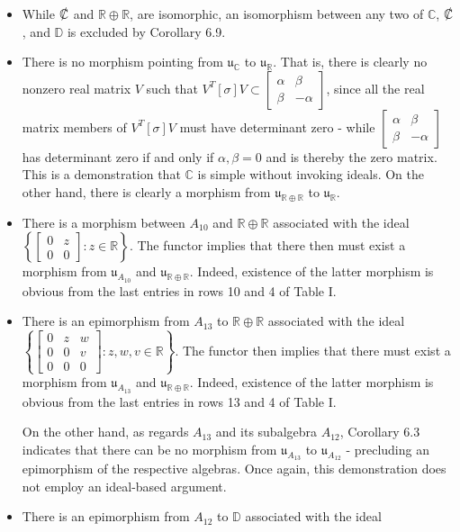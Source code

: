 \documentclass{amsart}
\numberwithin{equation}{section}
\theoremstyle{definition}
\numberwithin{theorem}{section}
\begin{document}
\begin{itemize}
\item While $\slashed{\mathbb{C}}$ and $\mathbb{R}\oplus\mathbb{R}$, are isomorphic, an isomorphism between any two of $\mathbb{C}$, $\slashed{\mathbb{C}}$, and $\mathbb{D}$ is excluded by Corollary 6.9.  
\item  There is no morphism pointing from $\mathfrak{u}_{\mathbb{C}}$ to $\mathfrak{u}_{\mathbb{R}}$. That is, there is clearly no nonzero real matrix $V$ such that $V^T[\sigma]V \subset \left[\begin{array}{ccc}
 \alpha & \beta   \\ 
 \beta & -\alpha    
\end{array}\right]$, since all the real matrix members of $V^T[\sigma]V$  must have determinant zero - while $\left[\begin{array}{ccc}
 \alpha & \beta   \\ 
 \beta & -\alpha    
\end{array}\right]$ has determinant zero if and only if $\alpha,\beta = 0$ and is thereby the zero matrix. This is a demonstration that $\mathbb{C}$ is simple without invoking ideals.  On the other hand, there is clearly a morphism from $\mathfrak{u}_{\mathbb{R}\oplus\mathbb{R}}$ to $\mathfrak{u}_{\mathbb{R}}$.
\item There is a morphism between $A_{10}$ and $\mathbb{R}\oplus\mathbb{R}$ associated with the ideal $\left\{\left[\begin{array}{ccc}
 0 & z   \\ 
 0 & 0    
\end{array}\right]:z\in \mathbb{R}\right\}$.  The functor implies that there then must exist a morphism from $\mathfrak{u}_{A_{10}}$ and $\mathfrak{u}_{\mathbb{R}\oplus\mathbb{R}}$.  Indeed, existence of the latter morphism is obvious from the last entries in rows 10 and 4 of Table I.  
\item There is an epimorphism from $A_{13}$ to $\mathbb{R}\oplus\mathbb{R}$ associated with the ideal $\left\{\left[\begin{array}{ccc}
0  & z & w   \\
 0 & 0 & v \\
 0 & 0 & 0    
\end{array}\right]:z,w,v\in\mathbb{R}\right\}$. The functor then implies that there must exist a morphism from $\mathfrak{u}_{A_{13}}$ and $\mathfrak{u}_{\mathbb{R}\oplus\mathbb{R}}$.  Indeed, existence of the latter morphism is obvious from the last entries in rows 13 and 4 of Table I.  

On the other hand, as regards $A_{13}$ and its subalgebra $A_{12}$, Corollary 6.3 indicates that there can be no morphism from $\mathfrak{u}_{A_{13}}$ to $\mathfrak{u}_{A_{12}}$ - precluding an epimorphism of the respective algebras.  Once again, this demonstration does not employ an ideal-based argument.
\item 
There is an epimorphism from $A_{12}$ to  $\mathbb{D}$ associated with the ideal


\end{itemize}
\end{document}

